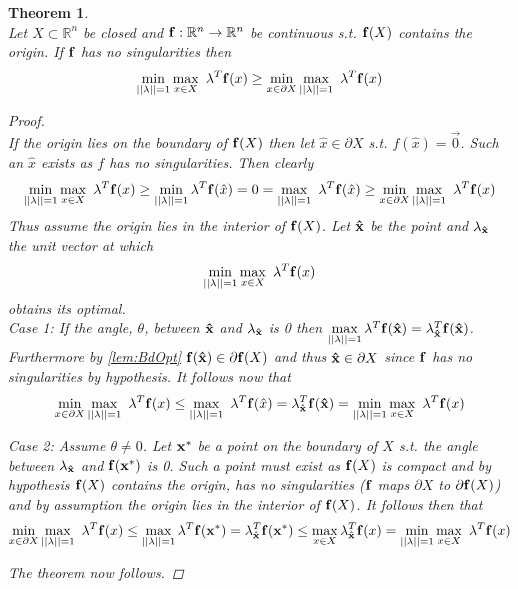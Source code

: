 \documentclass[11pt]{article}
\theoremstyle{plain}
\newtheorem{thm}{Theorem}[section]
\theoremstyle{definition}
\theoremstyle{remark}
\begin{document}
\begin{thm} \ \\
\label{thm:MainIneq}
Let $X\subset\mathbb{R}^n$ be closed and $\bold{f}:\mathbb{R}^n\rightarrow\mathbb{R}^n$ be continuous s.t. $\bold{f}(X)$ contains the origin. If $\bold{f}$ has no singularities then $$\min\limits_{||\bold{\lambda}||=1}\max\limits_{x\in X}\ \bold{\lambda}^T\bold{f}(x)\geq \min\limits_{x\in \partial X}\max\limits_{||\bold{\lambda}||=1}\ \bold{\lambda}^T\bold{f}(x)$$
\begin{proof} \ \\
If the origin lies on the boundary of $\bold{f}(X)$ then let $\hat{x}\in \partial X$ s.t. $f(\hat{x})=\vec{0}$. Such an $\hat{x}$ exists as $f$ has no singularities. Then  clearly $$\min\limits_{||\bold{\lambda}||=1}\max\limits_{x\in X}\ \bold{\lambda}^T\bold{f}(x)\geq \min\limits_{||\bold{\lambda}||=1}\bold{\lambda}^T\bold{f}(\hat{x})= 0 = \max\limits_{||\bold{\lambda}||=1}\ \bold{\lambda}^T\bold{f}(\hat{x}) \geq \min\limits_{x\in \partial X}\max\limits_{||\bold{\lambda}||=1}\ \bold{\lambda}^T\bold{f}(x)$$
Thus assume the origin lies in the interior of $\bold{f}(X)$.
Let $\bold{\hat{x}}$ be the point and $\bold{\lambda}_{\bold{\hat{x}}}$ the unit vector at which $$\min\limits_{||\bold{\lambda}||=1}\max\limits_{x\in X}\ \bold{\lambda}^T\bold{f}(x)$$
obtains its optimal. \\

Case 1: If the angle, $\theta$, between $\bold{\hat{x}}$ and $\bold{\lambda}_{\bold{\hat{x}}}$ is 0 then $\max\limits_{||\bold{\lambda}||=1}\bold{\lambda}^T\bold{f}(\bold{\hat{x}})=\bold{\lambda}_{\bold{\hat{x}}}^T\bold{f}(\bold{\hat{x}})$. Furthermore by \cref{lem:BdOpt} $\bold{f}(\bold{\hat{x}})\in \partial \bold{f}(X)$ and thus $\bold{\hat{x}}\in \partial X$ since $\bold{f}$ has no singularities by hypothesis. It follows now that $$\min\limits_{x\in \partial X}\max\limits_{||\bold{\lambda}||=1}\ \bold{\lambda}^T\bold{f}(x)\leq \max\limits_{||\bold{\lambda}||=1}\ \bold{\lambda}^T\bold{f}(\hat{x})=\bold{\lambda}_{\bold{\hat{x}}}^T\bold{f}(\bold{\hat{x}})=\min\limits_{||\bold{\lambda}||=1}\max\limits_{x\in X}\ \bold{\lambda}^T\bold{f}(x)$$

Case 2: Assume $\theta \neq 0$. Let $\bold{x^*}$ be a point on the boundary of $X$ s.t. the angle between $\bold{\lambda}_{\bold{\hat{x}}}$ and $\bold{f}(\bold{x^*})$ is 0. Such a point must exist as $\bold{f}(X)$ is compact and by hypothesis $\bold{f}(X)$ contains the origin, has no singularities ($\bold{f}$ maps $\partial X$ to $\partial \bold{f}(X)$) and by assumption the origin lies in the interior of $\bold{f}(X)$. It follows then that $$\min\limits_{x\in \partial X}\max\limits_{||\bold{\lambda}||=1}\ \bold{\lambda}^T\bold{f}(x)\leq \max\limits_{||\bold{\lambda}||=1}\bold{\lambda}^T \bold{f}(\bold{x^*}) =\bold{\lambda}_{\bold{\hat{x}}}^T\bold{f}(\bold{x^*})\leq \max\limits_{x\in X}\bold{\lambda}_{\bold{\hat{x}}}^T\bold{f}(x)=\min\limits_{||\bold{\lambda}||=1}\max\limits_{x\in X}\ \bold{\lambda}^T\bold{f}(x)$$

The theorem now follows.

\end{proof}
\end{thm}
\ \\
\end{document}
